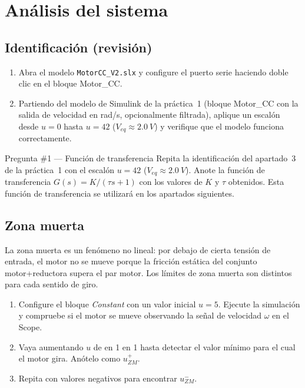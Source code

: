 \documentclass[12pt,a4paper]{article}
\begin{document}
\section{Análisis del sistema}

\subsection{Identificación (revisión)}

\begin{enumerate}
  \item Abra el modelo \texttt{MotorCC\_V2.slx} y configure el puerto serie
        haciendo doble clic en el bloque Motor\_CC.
  \item Partiendo del modelo de Simulink de la práctica~1 (bloque Motor\_CC con
        la salida de velocidad en rad/s, opcionalmente filtrada), aplique un
        escalón desde $u=0$ hasta $u=42$ ($V_{eq}\approx\SI{2.0}{V}$) y
        verifique que el modelo funciona correctamente.
\end{enumerate}

\begin{pregunta}{Pregunta \#1 — Función de transferencia}
  Repita la identificación del apartado~3 de la práctica~1 con el escalón
  $u=42$ ($V_{eq}\approx\SI{2.0}{V}$). Anote la función de transferencia
  $G(s)=K/(\tau s+1)$ con los valores de $K$ y $\tau$ obtenidos.
  Esta función de transferencia se utilizará en los apartados siguientes.
\end{pregunta}

\subsection{Zona muerta}

La zona muerta es un fenómeno no lineal: por debajo de cierta tensión de entrada,
el motor no se mueve porque la fricción estática del conjunto motor+reductora supera
el par motor. Los límites de zona muerta son distintos para cada sentido de giro.

\begin{enumerate}
  \item Configure el bloque \emph{Constant} con un valor inicial $u=5$.
        Ejecute la simulación y compruebe si el motor se mueve observando la señal
        de velocidad $\omega$ en el Scope.
  \item Vaya aumentando $u$ de en 1 en 1 hasta detectar el valor mínimo para el
        cual el motor gira. Anótelo como $u_{ZM}^{+}$.
  \item Repita con valores negativos para encontrar $u_{ZM}^{-}$.
\end{enumerate}
\end{document}
